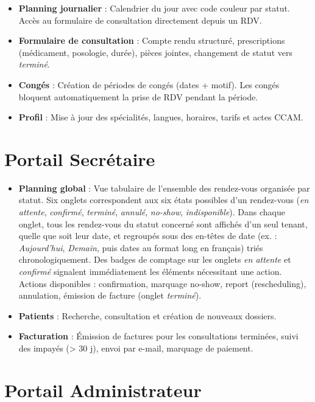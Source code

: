 \documentclass[12pt,a4paper]{report}
\begin{document}
\begin{itemize}[leftmargin=*,itemsep=3pt]
  \item \textbf{Planning journalier} : Calendrier du jour avec code couleur par statut. Accès au formulaire de consultation directement depuis un RDV.
  \item \textbf{Formulaire de consultation} : Compte rendu structuré, prescriptions (médicament, posologie, durée), pièces jointes, changement de statut vers \textit{terminé}.
  \item \textbf{Congés} : Création de périodes de congés (dates + motif). Les congés bloquent automatiquement la prise de RDV pendant la période.
  \item \textbf{Profil} : Mise à jour des spécialités, langues, horaires, tarifs et actes CCAM.
\end{itemize}

\section{Portail Secrétaire}

\begin{itemize}[leftmargin=*,itemsep=3pt]
  \item \textbf{Planning global} : Vue tabulaire de l'ensemble des rendez-vous organisée par statut.
    Six onglets correspondent aux six états possibles d'un rendez-vous
    (\textit{en attente}, \textit{confirmé}, \textit{terminé}, \textit{annulé}, \textit{no-show},
    \textit{indisponible}). Dans chaque onglet, tous les rendez-vous du statut concerné sont
    affichés d'un seul tenant, quelle que soit leur date, et regroupés sous des en-têtes de date
    (ex. : \textit{Aujourd'hui}, \textit{Demain}, puis dates au format long en français) triés
    chronologiquement. Des badges de comptage sur les onglets \textit{en attente} et
    \textit{confirmé} signalent immédiatement les éléments nécessitant une action.
    Actions disponibles : confirmation, marquage no-show, report (rescheduling), annulation,
    émission de facture (onglet \textit{terminé}).
  \item \textbf{Patients} : Recherche, consultation et création de nouveaux dossiers.
  \item \textbf{Facturation} : Émission de factures pour les consultations terminées, suivi des impayés (> 30 j), envoi par e-mail, marquage de paiement.
\end{itemize}

\section{Portail Administrateur}
\end{document}
